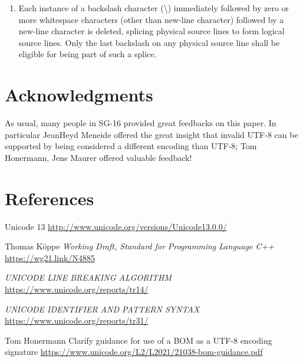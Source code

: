 \documentclass{wg21}
\begin{document}
\begin{enumerate}
\item
{}%
%
Each instance of a backslash character (\textbackslash)
immediately followed by zero or more whitespace characters (other than new-line character) followed by a new-line character is deleted, splicing
physical source lines to form logical source lines. Only the last
backslash on any physical source line shall be eligible for being part
of such a splice.

\end{enumerate}

\section{Acknowledgments}

As usual, many people in SG-16 provided great feedbacks on this paper.
In particular JeanHeyd Meneide offered the great insight that invalid UTF-8 can be supported by being considered a different encoding than UTF-8; Tom Honermann, Jens Maurer offered valuable feedback!


\section{References}
\renewcommand{\section}[2]{}%



\begin{thebibliography}{9}


Unicode 13\newline
\url{http://www.unicode.org/versions/Unicode13.0.0/}

Thomas Köppe
\emph{Working Draft, Standard for Programming Language C++}\newline
\url{https://wg21.link/N4885}

\emph{UNICODE LINE BREAKING ALGORITHM}\newline
\url{https://www.unicode.org/reports/tr14/}

\emph{UNICODE IDENTIFIER AND PATTERN SYNTAX}\newline
\url{https://www.unicode.org/reports/tr31/}

Tom Honermann
Clarify guidance for use of a BOM as a UTF-8 encoding signature
\url{https://www.unicode.org/L2/L2021/21038-bom-guidance.pdf}
    

\end{thebibliography}
\end{document}
